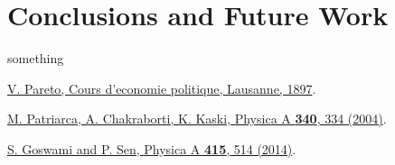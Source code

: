 \documentclass[12pt]{article} %
\begin{document}
\section{Conclusions and Future Work}
something

\begin{thebibliography}{2} %
\href{{http://www.institutcoppet.org/2012/05/08/cours-deconomie-politique-1896-de-vilfredo-pareto}}{V. Pareto, Cours d'economie politique, Lausanne, 1897}.

\href{{http://www.sciencedirect.com/science/article/pii/S0378437104004327}}{M. Patriarca, A. Chakraborti, K. Kaski, Physica A \textbf{340}, 334 (2004)}.

\href{{http://www.sciencedirect.com/science/article/pii/S0378437114006967}}{S. Goswami and P. Sen, Physica A \textbf{415}, 514 (2014)}.
\end{thebibliography}
\end{document}

